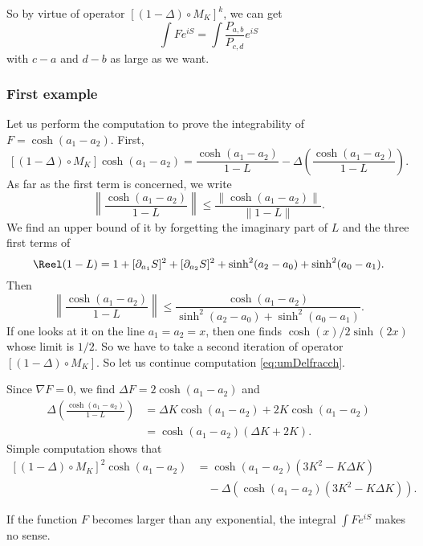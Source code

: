 So by virtue of operator $[(1-\Delta)\circ M_K]^k$, we can get
\begin{equation}
\int F  e^{iS}=\int \frac{P_{a,b}}{P_{c,d}} e^{iS}
\end{equation}
with $c-a$ and $d-b$ as large as we want.

\subsubsection{First example}

Let us perform the computation to prove the integrability of $F=\cosh(a_1-a_2)$. First,
\begin{equation}  \label{eq:umDelfracch}
  [(1-\Delta)\circ M_K]\cosh(a_1-a_2)=\frac{\cosh(a_1-a_2)}{1-L}-\Delta\left( \frac{\cosh(a_1-a_2)}{1-L} \right).
\end{equation}
As far as the first term is concerned, we write
\[ 
  \left\|  \frac{\cosh(a_1-a_2)}{1-L}  \right\|\leq \frac{\| \cosh(a_1-a_2) \|}{\| 1-L \|}.
\]
We find an upper bound of it by forgetting the imaginary part of $L$ and the three first terms of
\[ 
  \Reel(1-L)=1+[\partial_{a_1}S]^2+[\partial_{a_2}S]^2+\sinh^2(a_2-a_0)+\sinh^2(a_0-a_1).
\]
Then
\[ 
  \left\| \frac{\cosh(a_1-a_2)}{1-L}\right\|\leq \frac{\cosh(a_1-a_2)}{\sinh^2(a_2-a_0)+\sinh^2(a_0-a_1)}.
\]
If one looks at it on the line $a_1=a_2=x$, then one finds $\cosh(x)/2\sinh(2x)$ whose limit is $1/2$. So we have to take a second iteration of operator $[(1-\Delta)\circ M_K]$. So let us continue computation \eqref{eq:umDelfracch}. 

Since $\nabla F=0$, we find $\Delta F=2\cosh(a_1-a_2)$ and
\begin{equation}
\begin{split}
\Delta\left( \frac{\cosh(a_1-a_2)}{1-L} \right)&=\Delta K \cosh(a_1-a_2)+2K\cosh(a_1-a_2)\\
                                               &=\cosh(a_1-a_2)(\Delta K+2K).
\end{split}
\end{equation}
Simple computation shows that 
\begin{equation}
\begin{split}
[(1-\Delta)\circ M_K]^2\cosh(a_1-a_2)&=\cosh(a_1-a_2)(3K^2-K\Delta K)\\
		&\quad-\Delta(\cosh(a_1-a_2)(3K^2-K\Delta K)).
\end{split}
\end{equation}

\begin{lemma}
If the function $F$ becomes larger than any exponential, the integral $\int F e^{iS}$ makes no sense.
\end{lemma}

